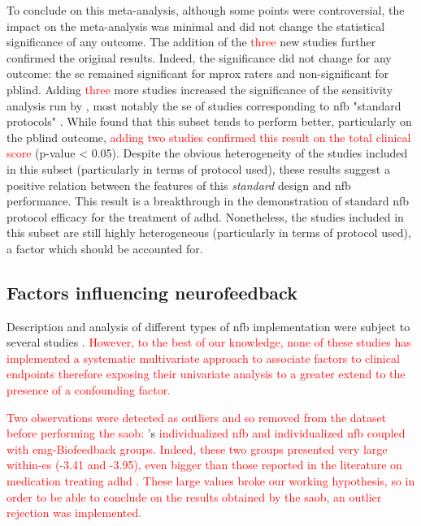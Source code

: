 To conclude on this meta-analysis, although some points were controversial, the impact on the
meta-analysis was minimal and did not change the statistical significance of any outcome. 
The addition of the \textcolor{red}{three} new studies \citep{Strehl2017, Baumeister2016, Bazanova2018} further confirmed the original results. Indeed, the
significance did not change for any outcome: the \gls{se} remained significant for \gls{mprox} raters and
non-significant for \gls{pblind}. Adding \textcolor{red}{three} more studies increased the significance of the sensitivity analysis run by
\citeauthor{Cortese2016}, most notably the \gls{se} of studies corresponding to \gls{nfb} "standard protocols" \citep{Arns2014}. 
While \citeauthor{Cortese2016} found that this subset tends to perform better, particularly on the \gls{pblind} outcome, 
\textcolor{red}{adding two studies confirmed this result on the total clinical score} (p-value < 0.05). Despite the obvious heterogeneity 
of the studies included in this subset (particularly in terms of protocol used), these results suggest a positive relation 
between the features of this \emph{standard} design and \gls{nfb} performance. This result is a breakthrough in the demonstration 
of standard \gls{nfb} protocol efficacy for the treatment of \gls{adhd}. Nonetheless, the  studies 
included in this subset are still highly heterogeneous (particularly in terms of protocol used), a factor which should be accounted for.


\subsection{Factors influencing neurofeedback}

Description and analysis of different types of \gls{nfb} implementation were subject to several studies \citep{Arns2014, 
Enriquez2017, Vernon2004, Jeunet2018, Arns2009, Cortese2016}. \textcolor{red}{However, to the best of our knowledge, none of these studies has 
implemented a systematic multivariate approach to associate factors to clinical endpoints therefore exposing their univariate analysis to a 
greater extend to the presence of a confounding factor.}

\textcolor{red}{Two observations were detected as outliers and so removed from the dataset before performing the \gls{saob}: }\citeauthor{Bazanova2018}'s \textcolor{red}{individualized \gls{nfb} and 
individualized \gls{nfb} coupled with \gls{emg}-Biofeedback groups. Indeed, these two groups presented very large within-\gls{es} (-3.41 and -3.95), even bigger than those reported in the literature on medication treating 
\gls{adhd}} \citep{Luan2017}\textcolor{red}{. These large values broke our working hypothesis, so in order to be able to conclude on the results obtained by the \gls{saob}, an outlier 
rejection was implemented.}

